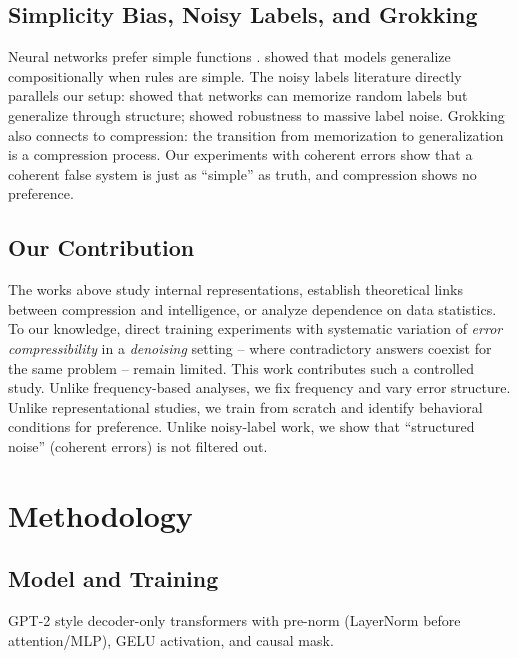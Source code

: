 \documentclass[10pt]{article} %
\begin{document}
\subsection{Simplicity Bias, Noisy Labels, and Grokking}

Neural networks prefer simple functions \citep{valle2019deep,mingard2021sgd,goldblum2024no,bhattamishra2023simplicity}. \citet{mesaros2024rule} showed that models generalize compositionally when rules are simple. The noisy labels literature directly parallels our setup: \citet{zhang2017understanding} showed that networks can memorize random labels but generalize through structure; \citet{rolnick2017deep} showed robustness to massive label noise. Grokking \citep{nanda2023progress,demoss2024complexity,liu2023grokking} also connects to compression: the transition from memorization to generalization is a compression process. Our experiments with coherent errors show that a coherent false system is just as ``simple'' as truth, and compression shows no preference.

\subsection{Our Contribution}

The works above study internal representations, establish theoretical links between compression and intelligence, or analyze dependence on data statistics. To our knowledge, direct training experiments with systematic variation of \textit{error compressibility} in a \textit{denoising} setting -- where contradictory answers coexist for the same problem -- remain limited. This work contributes such a controlled study. Unlike frequency-based analyses, we fix frequency and vary error structure. Unlike representational studies, we train from scratch and identify behavioral conditions for preference. Unlike noisy-label work, we show that ``structured noise'' (coherent errors) is not filtered out.

\section{Methodology}
\label{sec:methodology}

\subsection{Model and Training}
\label{sec:model}

GPT-2 style decoder-only transformers with pre-norm (LayerNorm before attention/MLP), GELU activation, and causal mask.
\end{document}
